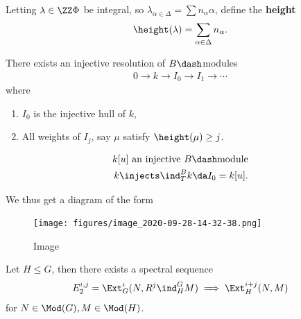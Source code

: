 Letting \(\lambda \in \ZZ\Phi\) be integral, so
\(\lambda_{\alpha \in \Delta} = \sum n_\alpha \alpha\), define the
\textbf{height}
\begin{align*}  
\height(\lambda) = \sum_{\alpha\in\Delta} n_\alpha
.\end{align*}

\begin{lemma}[?]

There exists an injective resolution of \(B\dash\)modules
\begin{align*}  
0\to k\to I_0 \to I_1 \to \cdots
\end{align*} where

\begin{enumerate}
\def\labelenumi{\arabic{enumi}.}
\tightlist
\item
  \(I_0\) is the injective hull of \(k\),
\item
  All weights of \(I_j\), say \(\mu\) satisfy \(\height(\mu) \geq j\).
\end{enumerate}

\end{lemma}

\begin{align*}  
k[u] \text{ an injective $B\dash$module} \\
k\injects \ind_T^B k \da I_0 = k[u]
.\end{align*}

We thus get a diagram of the form

\begin{figure}
\centering
\texttt{[image: figures/image\_2020-09-28-14-32-38.png]}
\caption{Image}
\end{figure}

\begin{proposition}[?]

Let \(H\leq G\), then there exists a spectral sequence
\begin{align*}  
E^{i, j}_2 = \Ext_G^i(N, R^j \ind_H^G M) \implies \Ext_H^{i+j}(N, M)
\end{align*} for \(N\in \Mod(G), M\in \Mod(H)\).

\end{proposition}

